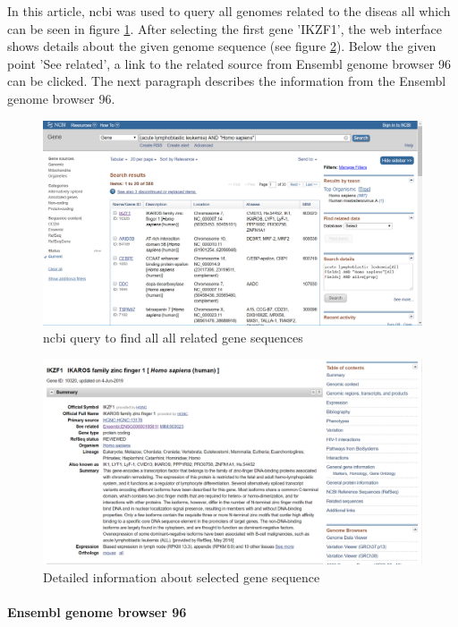 In this article, \gls{ncbi} was used to query all genomes related to the diseas \gls{all} which can be seen in figure \ref{ncbi_query}.
After selecting the first gene 'IKZF1', the web interface shows details about the given genome sequence (see figure \ref{gene_details}). Below the given point 'See related', a link to the related source from Ensembl genome browser 96 can be clicked. The next paragraph describes the information from the Ensembl genome browser 96.

\begin{figure}[htbp]
	\centering
	\includegraphics[width=1\textwidth]{Image/ncbi_all_result.png}
	\caption{\gls{ncbi} query to find all \gls{all} related gene sequences}
	\label{ncbi_query}
\end{figure}

\begin{figure}[htbp]
	\centering
	\includegraphics[width=1\textwidth]{Image/ncbi_gene_details.png}
	\caption{Detailed information about selected gene sequence}
	\label{gene_details}
\end{figure}

\paragraph{Ensembl genome browser 96}

